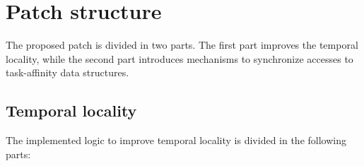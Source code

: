 \section{Patch structure}

The proposed patch is divided in two parts. The first part improves the temporal locality, while the second part introduces mechanisms to synchronize 
accesses to task-affinity data structures.

\subsection{Temporal locality}

The implemented logic to improve temporal locality is divided in the following parts:

